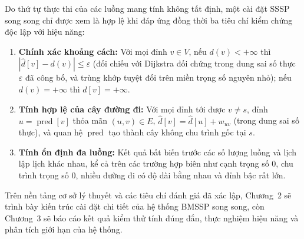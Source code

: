 Do thứ tự thực thi của các luồng mang tính không tất định, một cài đặt SSSP song song chỉ được xem là hợp lệ khi đáp ứng đồng thời ba tiêu chí kiểm chứng độc lập với hiệu năng:
\begin{enumerate}
    \item \textbf{Chính xác khoảng cách:} Với mọi đỉnh $v \in V$, nếu $d(v) < +\infty$ thì $|\widehat{d}[v] - d(v)| \le \varepsilon$ (đối chiếu với Dijkstra đối chứng trong dung sai số thực $\varepsilon$ đã công bố, và trùng khớp tuyệt đối trên miền trọng số nguyên nhỏ); nếu $d(v) = +\infty$ thì $\widehat{d}[v] = +\infty$.
    \item \textbf{Tính hợp lệ của cây đường đi:} Với mọi đỉnh tới được $v \neq s$, đỉnh $u = \operatorname{pred}[v]$ thỏa mãn $(u, v) \in E$, $\widehat{d}[v] = \widehat{d}[u] + w_{uv}$ (trong dung sai số thực), và quan hệ $\operatorname{pred}$ tạo thành cây không chu trình gốc tại $s$.
    \item \textbf{Tính ổn định đa luồng:} Kết quả bất biến trước các số lượng luồng và lịch lập lịch khác nhau, kể cả trên các trường hợp biên như cạnh trọng số $0$, chu trình trọng số $0$, nhiều đường đi có độ dài bằng nhau và đỉnh bậc rất lớn.
\end{enumerate}

Trên nền tảng cơ sở lý thuyết và các tiêu chí đánh giá đã xác lập, Chương~2 sẽ trình bày kiến trúc cài đặt chi tiết của hệ thống BMSSP song song, còn Chương~3 sẽ báo cáo kết quả kiểm thử tính đúng đắn, thực nghiệm hiệu năng và phân tích giới hạn của hệ thống.